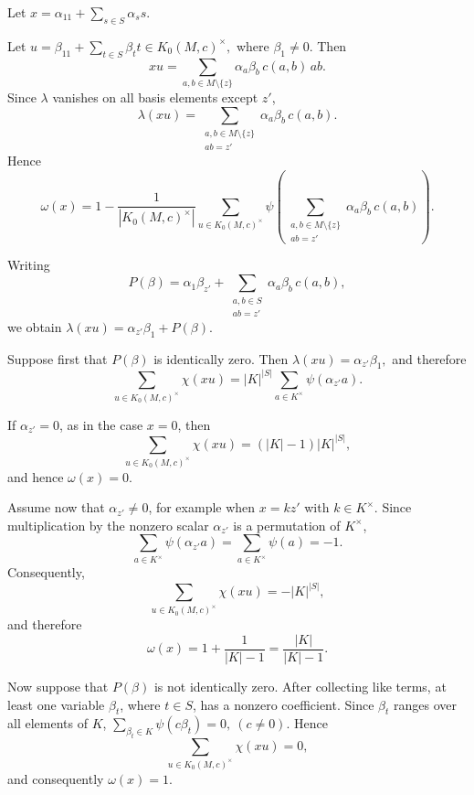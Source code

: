 \documentclass[11pt,reqno]{amsart}
\theoremstyle{plain}
\theoremstyle{remark}
\theoremstyle{definition}
\begin{document}
Let \(x=\alpha_11+\sum_{s\in S}\alpha_ss.\)

Let \(u=\beta_11+\sum_{t\in S}\beta_tt
\in K_0(M,c)^{\times}, \)
where \(\beta_1\neq0\). Then
\[
xu
=
\sum_{a,b\in M\setminus\{z\}}
\alpha_a\beta_b\,c(a,b)\,ab.
\]
Since \(\lambda\) vanishes on all basis elements except \(z'\),
\[
\lambda(xu)
=
\sum_{\substack{a,b\in M\setminus\{z\}\\ab=z'}}
\alpha_a\beta_b\,c(a,b).
\]
Hence
\[
\omega(x)
=
1-
\frac{1}{|K_0(M,c)^{\times}|}
\sum_{u\in K_0(M,c)^{\times}}
\psi\!\left(
\sum_{\substack{a,b\in M\setminus\{z\}\\ab=z'}}
\alpha_a\beta_b\,c(a,b)
\right).
\]

Writing
\[
P(\beta)
=
\alpha_1\beta_{z'}
+
\sum_{\substack{a,b\in S\\ab=z'}}
\alpha_a\beta_b\,c(a,b),
\]
we obtain
\(\lambda(xu)=\alpha_{z'}\beta_1+P(\beta).\)

Suppose first that \(P(\beta)\) is identically zero. Then
\(\lambda(xu)=\alpha_{z'}\beta_1,\)
and therefore
\[
\sum_{u\in K_0(M,c)^{\times}}\chi(xu)
=
|K|^{|S|}
\sum_{a\in K^\times}\psi(\alpha_{z'}a).
\]

If \(\alpha_{z'}=0\), as in the case \(x=0\), then
\[
\sum_{u\in K_0(M,c)^{\times}}\chi(xu)
=
(|K|-1)|K|^{|S|},
\]
and hence
\(\omega(x)=0.\)

Assume now that \(\alpha_{z'}\neq0\), for example when \(x=kz'\) with \(k\in K^\times\). Since multiplication by the nonzero scalar \(\alpha_{z'}\) is a permutation of \(K^\times\),
\[
\sum_{a\in K^\times}\psi(\alpha_{z'}a)
=
\sum_{a\in K^\times}\psi(a)
=
-1.
\]
Consequently,
\[
\sum_{u\in K_0(M,c)^{\times}}\chi(xu)
=
-|K|^{|S|},
\]
and therefore
\[
\omega(x)
=
1+\frac{1}{|K|-1}=\frac{|K|}{|K|-1}.
\]

Now suppose that \(P(\beta)\) is not identically zero. After collecting like terms, at least one variable \(\beta_t\), where \(t\in S\), has a nonzero coefficient. Since \(\beta_t\) ranges over all elements of \(K\),
\(\sum_{\beta_t\in K}\psi(c\beta_t)=0,
\ (c\neq0).\)
Hence
\[
\sum_{u\in K_0(M,c)^{\times}}\chi(xu)=0,
\]
and consequently
\(\omega(x)=1.\)
%
%
%
\end{document}
